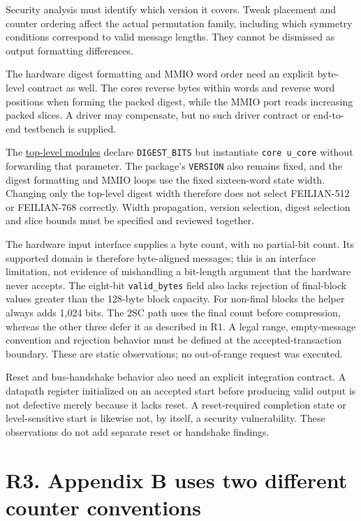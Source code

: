 \documentclass[
  english,
  11pt,
  a4paper,
]{article}
\begin{document}
Security analysis must identify which version it covers. Tweak placement
and counter ordering affect the actual permutation family, including
which symmetry conditions correspond to valid message lengths. They
cannot be dismissed as output formatting differences.

The hardware digest formatting and MMIO word order need an explicit
byte-level contract as well. The cores reverse bytes within words and
reverse word positions when forming the packed digest, while the MMIO
port reads increasing packed slices. A driver may compensate, but no
such driver contract or end-to-end testbench is supplied.

The \href{data/SOURCES.md\#source-13}{top-level modules} declare
\texttt{DIGEST\_BITS} but instantiate \texttt{core\ u\_core} without
forwarding that parameter. The package's \texttt{VERSION} also remains
fixed, and the digest formatting and MMIO loops use the fixed
sixteen-word state width. Changing only the top-level digest width
therefore does not select FEILIAN-512 or FEILIAN-768 correctly. Width
propagation, version selection, digest selection and slice bounds must
be specified and reviewed together.

The hardware input interface supplies a byte count, with no partial-bit
count. Its supported domain is therefore byte-aligned messages; this is
an interface limitation, not evidence of mishandling a bit-length
argument that the hardware never accepts. The eight-bit
\texttt{valid\_bytes} field also lacks rejection of final-block values
greater than the 128-byte block capacity. For non-final blocks the
helper always adds 1,024 bits. The 2SC path uses the final count before
compression, whereas the other three defer it as described in R1. A
legal range, empty-message convention and rejection behavior must be
defined at the accepted-transaction boundary. These are static
observations; no out-of-range request was executed.

Reset and bus-handshake behavior also need an explicit integration
contract. A datapath register initialized on an accepted start before
producing valid output is not defective merely because it lacks reset. A
reset-required completion state or level-sensitive start is likewise
not, by itself, a security vulnerability. These observations do not add
separate reset or handshake findings.


\section{R3. Appendix B uses two different counter
conventions}\label{r3.-appendix-b-uses-two-different-counter-conventions}
\end{document}
